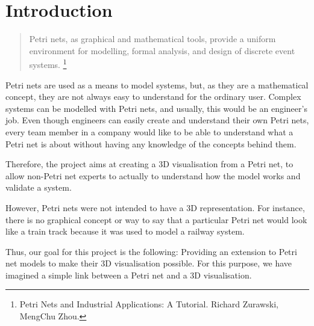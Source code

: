 \section{Introduction}

\begin{quotation}
Petri nets, as graphical and mathematical tools, provide a uniform environment for modelling, formal analysis, and design of discrete event systems. \footnote{Petri Nets and Industrial Applications: A Tutorial. Richard Zurawski, MengChu Zhou.}
\end{quotation}

Petri nets are used as a means to model systems, but, as they are a mathematical concept, they are not always easy to understand for the ordinary user. Complex systems can be modelled with Petri nets, and usually, this would be an engineer's job. Even though engineers can easily create and understand their own Petri nets, every team member in a company would like to be able to understand what a Petri net is about without having any knowledge of the concepts behind them.

Therefore, the project aims at creating a 3D visualisation from a Petri net, to allow non-Petri net experts to actually to understand how the model works and validate a system.

However, Petri nets were not intended to have a 3D representation. For instance, there is no graphical concept or way to say that a particular Petri net would look like a train track because it was used to model a railway system. 

Thus, our goal for this project is the following: Providing an extension to Petri net models to make their 3D visualisation possible. For this purpose, we have imagined a simple link between a Petri net and a 3D visualisation.


